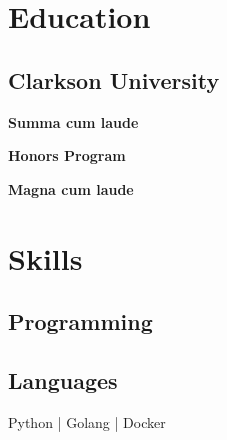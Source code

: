 \documentclass[]{deedy-resume-reversed}
\begin{document}
\begin{minipage}[t]{0.29\textwidth}

\section{Education}

\subsection{Clarkson University}
\vspace{2mm}

\vspace{3mm}
\begin{tightemize}
\item \textbf{Summa cum laude}
\end{tightemize}
\vspace{2mm}



\begin{tightemize}
\item \textbf{Honors Program}%
\item \textbf{Magna cum laude}
\end{tightemize}
\sectionsep

\section{Skills}

\subsection{Programming}
\subsection{Languages}
Python | Golang | Docker %
\sectionsep


\end{minipage}
\end{document}
